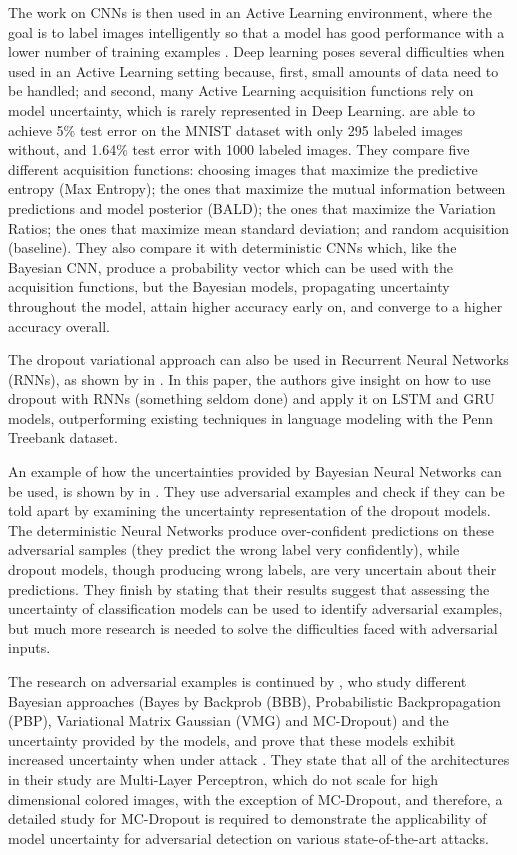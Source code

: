 The work on CNNs is then used in an Active Learning environment, where the goal is to label images intelligently so that a model has good performance with a lower number of training examples \cite{Gal2016Active}. Deep learning poses several difficulties when used in an Active Learning setting because, first, small amounts of data need to be handled; and second, many Active Learning acquisition functions rely on model uncertainty, which is rarely represented in Deep Learning. \citeauthor{Gal2016Active} are able to achieve 5\% test error on the MNIST dataset with only 295 labeled images without, and 1.64\% test error with 1000 labeled images. They compare five different acquisition functions: choosing images that maximize the predictive entropy (Max Entropy); the ones that maximize the mutual information between predictions and model posterior (BALD); the ones that maximize the Variation Ratios; the ones that maximize mean standard deviation; and random acquisition (baseline). They also compare it with deterministic CNNs which, like the Bayesian CNN, produce a probability vector which can be used with the acquisition functions, but the Bayesian models, propagating uncertainty throughout the model, attain higher accuracy early on, and converge to a higher accuracy overall.

The dropout variational approach can also be used in Recurrent Neural Networks (RNNs), as shown by \citeauthor{gal2016theoretically} in \cite{gal2016theoretically}. In this paper, the authors give insight on how to use dropout with RNNs (something seldom done) and apply it on LSTM and GRU models, outperforming existing techniques in language modeling with the Penn Treebank dataset.

An example of how the uncertainties provided by Bayesian Neural Networks can be used, is shown by \citeauthor{li2017dropout} in \cite{li2017dropout}. They use adversarial examples and check if they can be told apart by examining the uncertainty representation of the dropout models. The deterministic Neural Networks produce over-confident predictions on these adversarial samples (they predict the wrong label very confidently), while dropout models, though producing wrong labels, are very uncertain about their predictions. They finish by stating that their results suggest that assessing the uncertainty of classification models can be used to identify adversarial examples, but much more research is needed to solve the difficulties faced with adversarial inputs.

The research on adversarial examples is continued by \citeauthor{rawat2017adversarial}, who study different Bayesian approaches (Bayes by Backprob (BBB), Probabilistic Backpropagation (PBP), Variational Matrix Gaussian (VMG) and MC-Dropout) and the uncertainty provided by the models, and prove that these models exhibit increased uncertainty when under attack \cite{rawat2017adversarial}. They state that all of the architectures in their study are Multi-Layer Perceptron, which do not scale for high dimensional colored images, with the exception of MC-Dropout, and therefore, a detailed study for MC-Dropout is required to demonstrate the applicability of model uncertainty for adversarial detection on various state-of-the-art attacks.


